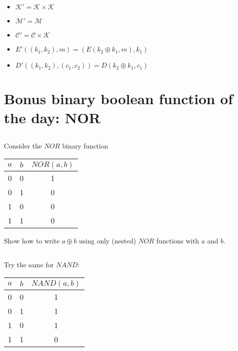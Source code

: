 \documentclass[12pt]{article}
\begin{document}
\subsection{}

\begin{itemize}
\item $\mathcal{K'} = \mathcal{K} \times \mathcal{K}$
\item $\mathcal{M'} = \mathcal{M}$
\item $\mathcal{C'} = \mathcal{C} \times \mathcal{K}$
\item $E'((k_1, k_2), m) = (E(k_2 \oplus k_1, m), k_1)$
\item $D'((k_1, k_2), (c_1, c_2)) = D(k_2 \oplus k_1, c_1)$
\end{itemize}


\section{Bonus binary boolean function of the day: NOR}

\subsection{}


Consider the $NOR$ binary function

\begin{center}
\begin{tabular}{|c|c||c|}
\hline
$a$ & $b$ & $NOR(a, b)$ \\
\hline
0 & 0 & 1 \\
0 & 1 & 0 \\
1 & 0 & 0 \\
1 & 1 & 0 \\
\hline
\end{tabular}
\end{center}

Show how to write $a \oplus b$ using only (nested) $NOR$ functions with $a$ and $b$.


\subsection{}


Try the same for $NAND$:

\begin{center}
\begin{tabular}{|c|c||c|}
\hline
$a$ & $b$ & $NAND(a, b)$ \\
\hline
0 & 0 & 1 \\
0 & 1 & 1 \\
1 & 0 & 1 \\
1 & 1 & 0 \\
\hline
\end{tabular}
\end{center}
\end{document}
